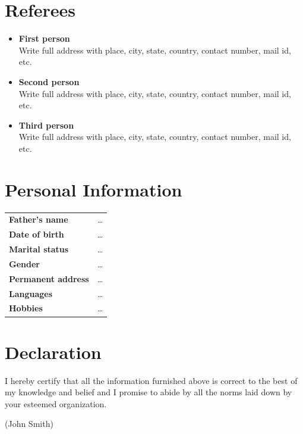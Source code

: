 \documentclass[11pt,a4paper]{moderncv}
\begin{document}
\section{Referees}

\begin{itemize}  	
	
    \item \textbf{First person}\\
	Write full address with place, city, state, country, contact number, mail id, etc.
	
	\item \textbf{Second person}\\
    Write full address with place, city, state, country, contact number, mail id, etc.
	
	\item \textbf{Third person}\\
	Write full address with place, city, state, country, contact number, mail id, etc.

\end{itemize}

\section{Personal Information}

\begin{tabular}{p{4cm}l}
\textbf{Father's name}         &    \ldots	\\
\textbf{Date of birth}         &    \ldots \\
\textbf{Marital status}        &    \ldots     \\
\textbf{Gender}                &    \ldots \\
\textbf{Permanent address}     &    \ldots \\
\textbf{Languages}             &    \ldots \\
\textbf{Hobbies}               &    \ldots
\end{tabular}

\section{Declaration}
I hereby certify that all the information furnished above is correct to the best of my knowledge and belief and I promise to abide by all the norms laid down by your esteemed organization.

\vskip10mm\raggedleft
(John Smith)
\end{document}
